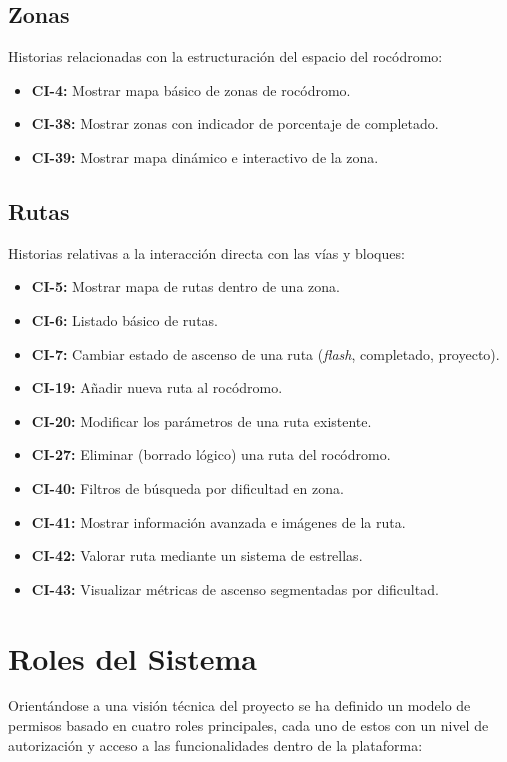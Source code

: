 \subsection{Zonas}
Historias relacionadas con la estructuración del espacio del rocódromo:
\begin{itemize}
    \item \textbf{CI-4:} Mostrar mapa básico de zonas de rocódromo.
    \item \textbf{CI-38:} Mostrar zonas con indicador de porcentaje de completado.
    \item \textbf{CI-39:} Mostrar mapa dinámico e interactivo de la zona.
\end{itemize}

\subsection{Rutas}
Historias relativas a la interacción directa con las vías y bloques:
\begin{itemize}
    \item \textbf{CI-5:} Mostrar mapa de rutas dentro de una zona.
    \item \textbf{CI-6:} Listado básico de rutas.
    \item \textbf{CI-7:} Cambiar estado de ascenso de una ruta (\textit{flash}, completado, proyecto).
    \item \textbf{CI-19:} Añadir nueva ruta al rocódromo.
    \item \textbf{CI-20:} Modificar los parámetros de una ruta existente.
    \item \textbf{CI-27:} Eliminar (borrado lógico) una ruta del rocódromo.
    \item \textbf{CI-40:} Filtros de búsqueda por dificultad en zona.
    \item \textbf{CI-41:} Mostrar información avanzada e imágenes de la ruta.
    \item \textbf{CI-42:} Valorar ruta mediante un sistema de estrellas.
    \item \textbf{CI-43:} Visualizar métricas de ascenso segmentadas por dificultad.
\end{itemize}

\section{Roles del Sistema}

Orientándose a una visión técnica del proyecto se ha definido un modelo de permisos basado en cuatro roles principales, cada uno de estos con un nivel de autorización y acceso a las funcionalidades dentro de la plataforma:

